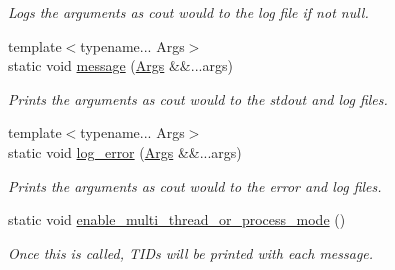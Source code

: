 \begin{DoxyCompactItemize}
\begin{DoxyCompactList}\small\item\em Logs the arguments as cout would to the log file if not null. \end{DoxyCompactList}\item 
{\footnotesize template$<$typename... Args$>$ }\\static void \hyperlink{class_utilities_ae8efd2e8950fe6641d87296b8120d246}{message} (\hyperlink{struct_args}{Args} \&\&...args)
\begin{DoxyCompactList}\small\item\em Prints the arguments as cout would to the stdout and log files. \end{DoxyCompactList}\item 
{\footnotesize template$<$typename... Args$>$ }\\static void \hyperlink{class_utilities_a3db9e78ec85d66d104cbf451706e1dbe}{log\+\_\+error} (\hyperlink{struct_args}{Args} \&\&...args)
\begin{DoxyCompactList}\small\item\em Prints the arguments as cout would to the error and log files. \end{DoxyCompactList}\item 
static void \hyperlink{class_utilities_a384728ae9b72982c1351d881ba7ff007}{enable\+\_\+multi\+\_\+thread\+\_\+or\+\_\+process\+\_\+mode} ()
\begin{DoxyCompactList}\small\item\em Once this is called, T\+I\+Ds will be printed with each message. \end{DoxyCompactList}\end{DoxyCompactItemize}
